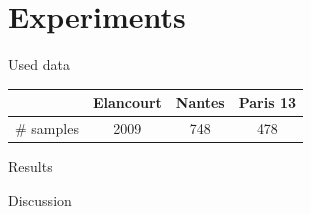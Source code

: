 \documentclass[10pt, export]{beamer}
\begin{document}
    \section{Experiments}
        \begin{frame}{Used data}
            \begin{table}
                \begin{center}
                    \begin{tabular}{c c c c}
                        \toprule
                         & Elancourt & Nantes & Paris 13 \\
                        \midrule
                        \# samples & 2009 & 748 & 478 \\
                        \bottomrule
                    \end{tabular}
                \end{center}
            \end{table}
        \end{frame}
        \begin{frame}{Results}
                
        \end{frame}
        \begin{frame}{Discussion}
                
        \end{frame}
\end{document}
